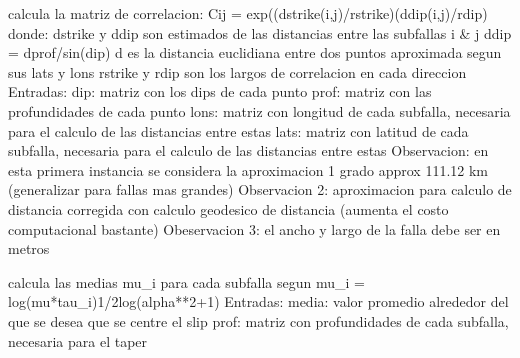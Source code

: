 \documentclass[letterpaper,10pt,english]{sphinxmanual}
\begin{document}
\begin{fulllineitems}
\label{\detokenize{main:main.matriz_covarianza_optimized}}
\pysigstartsignatures
{}
\pysigstopsignatures
\sphinxAtStartPar
calcula la matriz de correlacion:
Cij = exp(\sphinxhyphen{}(dstrike(i,j)/rstrike)\sphinxhyphen{}(ddip(i,j)/rdip)
donde:
dstrike y ddip son estimados de las distancias entre las subfallas i \& j
ddip = dprof/sin(dip)
d es la distancia euclidiana entre dos puntos aproximada segun sus lats y lons
rstrike y rdip son los largos de correlacion en cada direccion 
Entradas: 
dip: matriz con los dips de cada punto
prof: matriz con las profundidades de cada punto
lons: matriz con longitud de cada subfalla, necesaria para el calculo de las distancias entre estas
lats: matriz con latitud de cada subfalla, necesaria para el calculo de las distancias entre estas
Observacion: en esta primera instancia se considera la aproximacion  1 grado approx 111.12 km (generalizar para fallas mas grandes)
Observacion 2: aproximacion para calculo de distancia corregida con calculo geodesico de distancia (aumenta el costo computacional bastante)
Obeservacion 3: el ancho y largo de la falla debe ser en metros

\end{fulllineitems}


\begin{fulllineitems}
\label{\detokenize{main:main.matriz_medias}}
\pysigstartsignatures
{}
\pysigstopsignatures
\sphinxAtStartPar
calcula las medias mu\_i para cada subfalla segun mu\_i = log(mu*tau\_i)\sphinxhyphen{}1/2log(alpha**2+1)
Entradas:
media: valor promedio alrededor del que se desea que se centre el slip
prof: matriz con profundidades de cada subfalla, necesaria para el taper

\end{fulllineitems}
\end{document}

